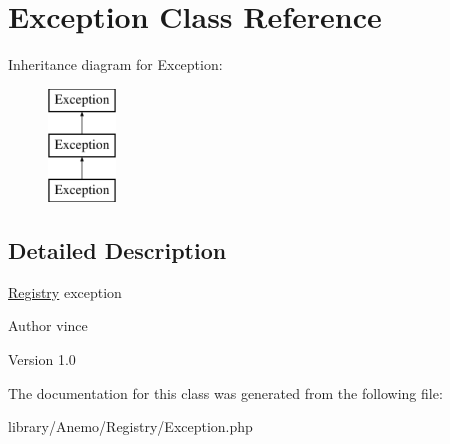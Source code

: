 \hypertarget{class_anemo_1_1_registry_1_1_exception}{
\section{Exception Class Reference}
\label{class_anemo_1_1_registry_1_1_exception}
}
Inheritance diagram for Exception:\begin{figure}[H]
\begin{center}
\leavevmode
\includegraphics[height=3.000000cm]{class_anemo_1_1_registry_1_1_exception}
\end{center}
\end{figure}


\subsection{Detailed Description}
\hyperlink{class_anemo_1_1_registry}{Registry} exception \begin{DoxyAuthor}{Author}
vince 
\end{DoxyAuthor}
\begin{DoxyVersion}{Version}
1.0 
\end{DoxyVersion}


The documentation for this class was generated from the following file:\begin{DoxyCompactItemize}
\item 
library/Anemo/Registry/Exception.php\end{DoxyCompactItemize}
